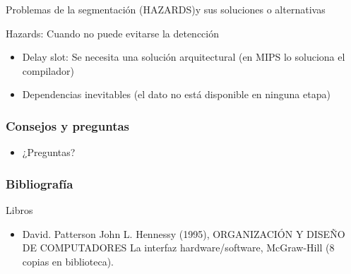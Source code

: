\documentclass[aspectratio=169,compress]{beamer}
\begin{document}
\begin{footnotesize}
\begin{frame}{Problemas de la segmentación (HAZARDS)}{y sus soluciones o alternativas}
\end{frame}


\begin{frame}{Hazards: Cuando no puede evitarse la detencción}
\begin{itemize}
\item Delay slot: Se necesita una solución arquitectural (en MIPS lo soluciona el compilador)
\item Dependencias inevitables (el dato no está disponible en ninguna etapa)
\end{itemize}

\end{frame}


\begin{frame}
 \frametitle{Consejos y preguntas}
\begin{center}
\begin{itemize}
\item  ¿Preguntas?
\end{itemize}
\end{center}
\end{frame}


\begin{frame}
 \frametitle{Bibliografía}
Libros
\begin{itemize}
\item David. Patterson John L. Hennessy (1995), ORGANIZACIÓN Y DISEÑO DE COMPUTADORES La interfaz hardware/software, McGraw-Hill (8 copias en biblioteca).
\end{itemize}
\end{frame}

\end{footnotesize}
\end{document}

